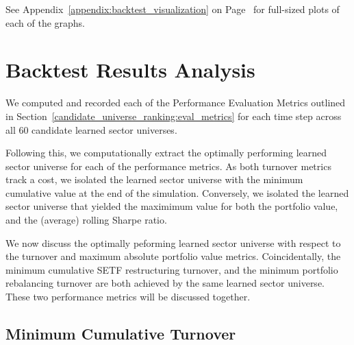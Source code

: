 \documentclass[../main.tex]{subfiles}
\begin{document}
See Appendix~\ref{appendix:backtest_visualization} on Page~\pageref{appendix:backtest_visualization} for full-sized plots of each of the graphs.


\section{Backtest Results Analysis}

We computed and recorded each of the Performance Evaluation Metrics outlined in Section~\ref{candidate_universe_ranking:eval_metrics} for each time step across all 60 candidate learned sector universes.

Following this, we computationally extract the optimally performing learned sector universe for each of the performance metrics. As both turnover metrics track a cost, we isolated the learned sector universe with the minimum cumulative value at the end of the simulation. Conversely, we isolated the learned sector universe that yielded the maximimum value for both the portfolio value, and the (average) rolling Sharpe ratio.

We now discuss the optimally peforming learned sector universe with respect to the turnover and maximum absolute portfolio value metrics. Coincidentally, the minimum cumulative SETF restructuring turnover, and the minimum portfolio rebalancing turnover are both achieved by the same learned sector universe. These two performance metrics will be discussed together.

\subsection{Minimum Cumulative Turnover}
\end{document}
